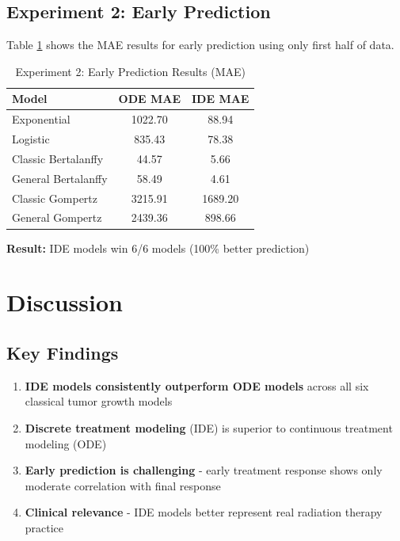 \documentclass[11pt]{article}
\begin{document}
\subsection{Experiment 2: Early Prediction}

Table \ref{tab:exp2} shows the MAE results for early prediction using only first half of data.

\begin{table}[h]
\centering
\caption{Experiment 2: Early Prediction Results (MAE)}
\label{tab:exp2}
\begin{tabular}{@{}lcc@{}}
\toprule
Model & ODE MAE & IDE MAE \\
\midrule
Exponential & 1022.70 & 88.94 \\
Logistic & 835.43 & 78.38 \\
Classic Bertalanffy & 44.57 & 5.66 \\
General Bertalanffy & 58.49 & 4.61 \\
Classic Gompertz & 3215.91 & 1689.20 \\
General Gompertz & 2439.36 & 898.66 \\
\bottomrule
\end{tabular}
\end{table}

\textbf{Result:} IDE models win 6/6 models (100\% better prediction)

\section{Discussion}

\subsection{Key Findings}

\begin{enumerate}
    \item \textbf{IDE models consistently outperform ODE models} across all six classical tumor growth models
    \item \textbf{Discrete treatment modeling} (IDE) is superior to continuous treatment modeling (ODE)
    \item \textbf{Early prediction is challenging} - early treatment response shows only moderate correlation with final response
    \item \textbf{Clinical relevance} - IDE models better represent real radiation therapy practice
\end{enumerate}
\end{document}
